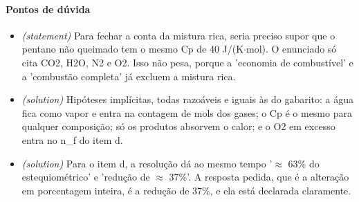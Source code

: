 \documentclass{article}%
\begin{document}
\paragraph{Pontos de dúvida}%
\begin{itemize}%
\item%
\textit{(statement)} Para fechar a conta da mistura rica, seria preciso supor que o pentano não queimado tem o mesmo Cp de 40 J/(K$\cdot$mol). O enunciado só cita CO2, H2O, N2 e O2. Isso não pesa, porque a 'economia de combustível' e a 'combustão completa' já excluem a mistura rica.%
\item%
\textit{(solution)} Hipóteses implícitas, todas razoáveis e iguais às do gabarito: a água fica como vapor e entra na contagem de mols dos gases; o Cp é o mesmo para qualquer composição; só os produtos absorvem o calor; e o O2 em excesso entra no n\_f do item d.%
\item%
\textit{(solution)} Para o item d, a resolução dá ao mesmo tempo '$\approx$ 63\% do estequiométrico' e 'redução de $\approx$ 37\%'. A resposta pedida, que é a alteração em porcentagem inteira, é a redução de 37\%, e ela está declarada claramente.%
\end{itemize}%
\end{document}
